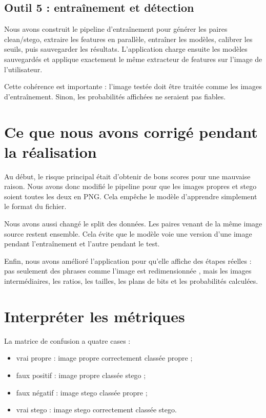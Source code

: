 \documentclass[11pt,a4paper]{article}
\begin{document}
\subsection*{Outil 5 : entraînement et détection}
Nous avons construit le pipeline d'entraînement pour générer les paires clean/stego, extraire les features en parallèle, entraîner les modèles, calibrer les seuils, puis sauvegarder les résultats. L'application charge ensuite les modèles sauvegardés et applique exactement le même extracteur de features sur l'image de l'utilisateur.

Cette cohérence est importante : l'image testée doit être traitée comme les images d'entraînement. Sinon, les probabilités affichées ne seraient pas fiables.

\section{Ce que nous avons corrigé pendant la réalisation}
Au début, le risque principal était d'obtenir de bons scores pour une mauvaise raison. Nous avons donc modifié le pipeline pour que les images propres et stego soient toutes les deux en PNG. Cela empêche le modèle d'apprendre simplement le format du fichier.

Nous avons aussi changé le split des données. Les paires venant de la même image source restent ensemble. Cela évite que le modèle voie une version d'une image pendant l'entraînement et l'autre pendant le test.

Enfin, nous avons amélioré l'application pour qu'elle affiche des étapes réelles : pas seulement des phrases comme \og l'image est redimensionnée \fg{}, mais les images intermédiaires, les ratios, les tailles, les plans de bits et les probabilités calculées.

\section{Interpréter les métriques}
La matrice de confusion a quatre cases :
\begin{itemize}
  \item vrai propre : image propre correctement classée propre ;
  \item faux positif : image propre classée stego ;
  \item faux négatif : image stego classée propre ;
  \item vrai stego : image stego correctement classée stego.
\end{itemize}
\end{document}
